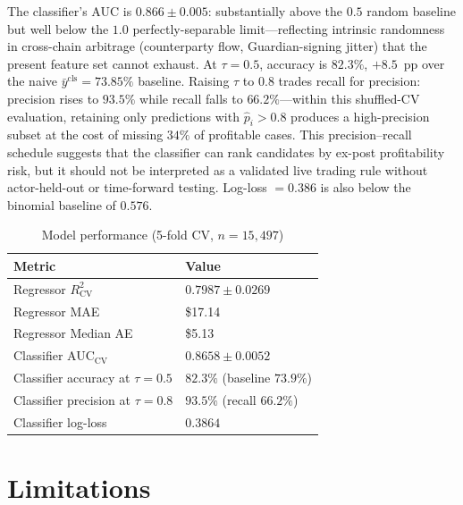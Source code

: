 \documentclass[sigconf,nonacm,10pt]{acmart}
\begin{document}
The classifier's AUC is $0.866\pm 0.005$: substantially above
the $0.5$ random baseline but well below the $1.0$ perfectly-separable
limit---reflecting intrinsic randomness in cross-chain arbitrage
(counterparty flow, Guardian-signing jitter) that the present feature
set cannot exhaust. At $\tau=0.5$, accuracy is $82.3\%$, $+8.5$~pp
over the naive $\bar y^{\text{cls}}=73.85\%$ baseline. Raising
$\tau$ to $0.8$ trades recall for precision: precision rises to
$93.5\%$ while recall falls to $66.2\%$---within this shuffled-CV
evaluation, retaining only predictions with $\hat p_i>0.8$ produces a
high-precision subset at the cost of missing $34\%$ of profitable
cases. This precision--recall schedule suggests that the classifier
can rank candidates by ex-post profitability risk, but it should not
be interpreted as a validated live trading rule without actor-held-out
or time-forward testing. Log-loss $=0.386$ is also below the binomial
baseline of $0.576$.

\begin{table}[h]
  \centering
  \small
  \caption{Model performance (5-fold CV, $n=15{,}497$)}
  \label{tab:model}
  \begin{tabular}{ll}
    \toprule
    \textbf{Metric} & \textbf{Value} \\
    \midrule
    Regressor $R^2_{\text{CV}}$              & $0.7987 \pm 0.0269$ \\
    Regressor MAE                            & \$17.14 \\
    Regressor Median AE                      & \$5.13 \\
    Classifier AUC$_{\text{CV}}$             & $0.8658 \pm 0.0052$ \\
    Classifier accuracy at $\tau=0.5$        & $82.3\%$ (baseline $73.9\%$) \\
    Classifier precision at $\tau=0.8$       & $93.5\%$ (recall $66.2\%$) \\
    Classifier log-loss                      & $0.3864$ \\
    \bottomrule
  \end{tabular}
\end{table}

\section{Limitations}
\label{sec:limitations}
\end{document}
